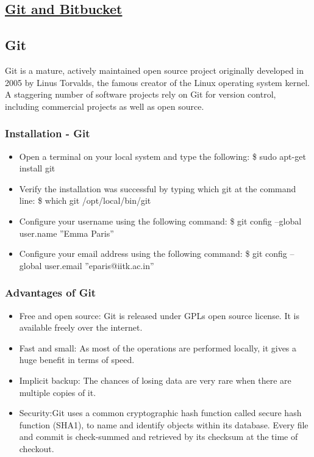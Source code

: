\documentclass[a4paper, 12pt]{article}
\begin{document}
\newpage

\begin{center}
\section{\underline{Git and Bitbucket}}
\end{center}

\subsection{Git}
Git is a mature, actively maintained open source project originally developed in 2005 by Linus Torvalds, the famous 
creator of the Linux operating system kernel. A staggering number of software projects rely on Git for version control,
including commercial projects as well as open source.

\subsubsection{Installation - Git}
\begin{itemize}
\item Open a terminal on your local system and type the following: \$ sudo apt-get install git
\item Verify the installation was successful by typing which git at the command line: \$ which git /opt/local/bin/git
\item Configure your username using the following command: \$ git config –global user.name
”Emma Paris”
\item Configure your email address using the following command: \$ git config –global user.email ”eparis@iitk.ac.in”
\end{itemize}

\subsubsection{Advantages of Git}
\begin{itemize}
\item Free and open source: Git is released under GPLs open source license. It is available freely over the internet.
\item Fast and small: As most of the operations are performed locally, it gives a
huge benefit in terms of speed.
\item Implicit backup: The chances of losing data are very rare when
there are multiple copies of it.
\item Security:Git uses a common cryptographic hash function called
secure hash function (SHA1), to name and identify objects within its database. Every file and commit is check-summed and retrieved by its checksum at the time of checkout.
\end{itemize}
\end{document}
